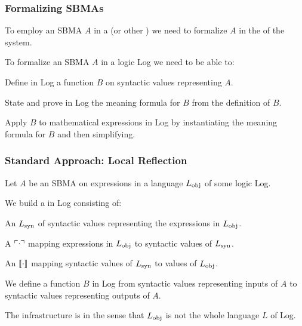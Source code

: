 \documentclass[t,12pt,numbers,fleqn]{beamer}
\begin{document}

\begin{frame}
\frametitle{Formalizing SBMAs}
\bi

  \item To employ an SBMA $A$ in a  (or
    other ) we need to formalize $A$
    in the  of the system.

\bigskip

  \item To formalize an SBMA $A$ in a logic Log we need
    to be able to:

  \be

    \item Define in Log a function $B$ on syntactic
      values representing $A$.

    \item State and prove in Log the meaning formula for
      $B$ from the definition of $B$.

    \item Apply $B$ to mathematical expressions in Log by
      instantiating the meaning formula for $B$ and then simplifying.

  \ee

\ei
\end{frame}


\begin{frame}
\frametitle{Standard Approach: Local Reflection}
\bi

  \item Let $A$ be an SBMA on expressions in a language $L_{\rm obj}$
    of some logic Log.

  \item We build a  in Log
    consisting of:

  \be

    \item An  $L_{\rm syn}$ of syntactic values
      representing the expressions in $L_{\rm obj}$.

    \item A  $\ulcorner\cdot\urcorner$ mapping
      expressions in $L_{\rm obj}$ to syntactic values of $L_{\rm
        syn}$.

    \item An  $\llbracket\cdot\rrbracket$
      mapping syntactic values of $L_{\rm syn}$ to values of $L_{\rm
        obj}$.

  \ee

  \item We define a function $B$ in Log from
    syntactic values representing inputs of $A$ to syntactic
    values representing outputs of $A$.

  \item The infrastructure is  in the sense that $L_{\rm
    obj}$ is not the whole language $L$ of Log.

\ei
\end{frame}
\end{document}
